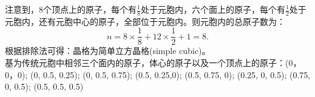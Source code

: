 \documentclass[reqno,a4paper,12pt]{amsart}
\begin{document}
\begin{tcolorbox}[breakable, colback = black!5!white, colframe = black]
注意到，8个顶点上的原子，每个有$\frac{1}{8}$处于元胞内，六个面上的原子，每个有$\frac{1}{2}$处于元胞内，还有元胞中心的原子，全部位于元胞内。则元胞内的总原子数为：
\[
	n = 8\times \frac{1}{8} + 12 \times \frac{1}{2} + 1 = 8.
\]
根据排除法可得：晶格为简单立方晶格(simple cubic)。 \\
基为传统元胞中相邻三个面内的原子，体心的原子以及一个顶点上的原子：(0，0，0); (0, 0.5, 0.25); (0, 0.5, 0.75); (0.5, 0.25,0); (0.5, 0.75, 0); (0.25, 0, 0.5); (0.75, 0, 0.5); (0.5, 0.5, 0.5)
\end{tcolorbox}
\end{document}
